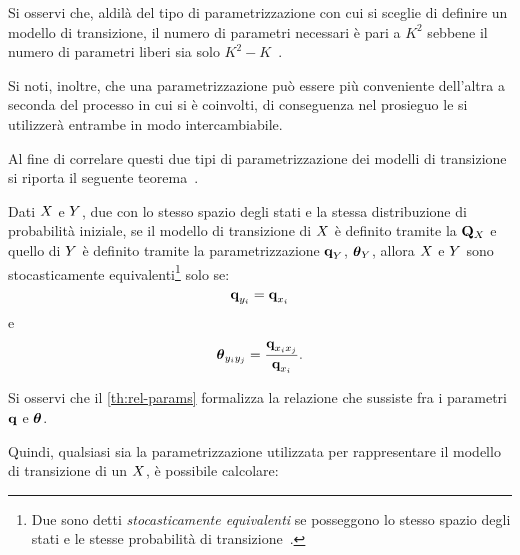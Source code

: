 \begin{osservazione}
Si osservi che, aldilà del tipo di parametrizzazione con cui si sceglie di definire un modello di transizione, il numero di parametri necessari è pari a $K^2$ sebbene il numero di parametri liberi sia solo $K^2-K$~\citep{Nodelman2007}.
\end{osservazione}
\begin{osservazione}
Si noti, inoltre, che una parametrizzazione può essere più conveniente dell'altra a seconda del processo in cui si è coinvolti, di conseguenza nel prosieguo le si utilizzerà entrambe in modo intercambiabile.
\end{osservazione}
Al fine di correlare questi due tipi di parametrizzazione dei modelli di transizione si riporta il seguente teorema~\citep{Nodelman2007}.
\begin{teorema}\label{th:rel-params}
Dati $\mathnormal{X}$ e $\mathnormal{Y}$, due \mprocess{} \omog{} con lo stesso spazio degli stati e la stessa distribuzione di probabilità iniziale, se il modello di transizione di $\mathnormal{X}$ è definito tramite la \im*{} $\mathbf{Q}_{\mathnormal{X}}$ e quello di $\mathnormal{Y}$ è definito tramite la parametrizzazione  $\boldsymbol{\textbf{\text{q}}}_{\mathnormal{Y}}$, $\boldsymbol{\textbf{\text{$\theta$}}}_{\mathnormal{Y}}$, allora $\mathnormal{X}$ e $\mathnormal{Y}$ sono stocasticamente equivalenti\footnote{Due \mprocess{} sono detti \emph{stocasticamente equivalenti} se posseggono lo stesso spazio degli stati e le stesse probabilità di transizione~\citep{Gihman1973}.} solo se:
\[
\boldsymbol{\textbf{\text{q}}}_{\mathnormal{y}_i} = \boldsymbol{\textbf{\text{q}}}_{\mathnormal{x}_i}
\]
e
\[
\boldsymbol{\textbf{\text{$\theta$}}}_{\mathnormal{y}_i\mathnormal{y}_j} = \frac{\boldsymbol{\textbf{\text{q}}}_{\mathnormal{x}_i\mathnormal{x}_j}}{\boldsymbol{\textbf{\text{q}}}_{\mathnormal{x}_i}}\text{.}
\]
\end{teorema}
\begin{osservazione}
Si osservi che il \autoref{th:rel-params} formalizza la relazione che sussiste fra i parametri $\boldsymbol{\textbf{\text{q}}}$ e $\boldsymbol{\textbf{\text{$\theta$}}}$.
\end{osservazione}
Quindi, qualsiasi sia la parametrizzazione utilizzata per rappresentare il modello di transizione di un \mprocess*{} \omog*{} $\mathnormal{X}$, è possibile calcolare:

